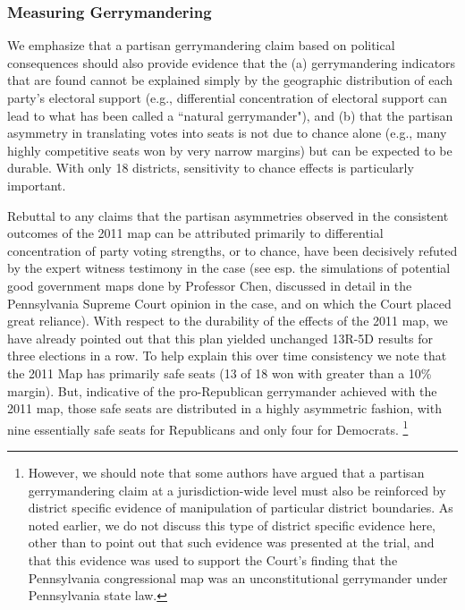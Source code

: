         \subsubsection*{Measuring Gerrymandering}
    We emphasize that a partisan gerrymandering claim based on political consequences should also provide evidence that the (a) gerrymandering indicators that are found cannot be explained simply by the geographic distribution of each party’s electoral support (e.g., differential concentration of electoral support can lead to what has been called a ``natural gerrymander"), and (b) that the partisan asymmetry in translating votes into seats is not due to chance alone (e.g., many highly competitive seats won by very narrow margins) but can be expected to be durable. With only 18 districts, sensitivity to chance effects is particularly important. 
\par
    Rebuttal to any claims that the partisan asymmetries observed in the consistent outcomes of the 2011 map can be attributed primarily to differential concentration of party voting strengths, or to chance, have been decisively refuted by the expert witness testimony in the case (see esp. the simulations of potential good government maps done by Professor Chen, discussed in detail in the Pennsylvania Supreme Court opinion in the case, and on which the Court placed great reliance). With respect to the durability of the effects of the 2011 map, we have already pointed out that this plan yielded unchanged 13R-5D results for three elections in a row. To help explain this over time consistency we note that the 2011 Map has primarily safe seats (13 of 18 won with greater than a 10\% margin). But, indicative of the pro-Republican gerrymander achieved with the 2011 map, those safe seats are distributed in a highly asymmetric fashion, with nine essentially safe seats for Republicans and only four for Democrats.
        \footnote{However, we should note that some authors \citep[e.g.,][]{Grofman2019_ELJ} have argued that a partisan gerrymandering claim at a jurisdiction-wide level must also be reinforced by district specific evidence of manipulation of particular district boundaries. As noted earlier, we do not discuss this type of district specific evidence here, other than to point out that such evidence was presented at the trial, and that this evidence was used to support the Court’s finding that the Pennsylvania congressional map was an unconstitutional gerrymander under Pennsylvania state law.}
